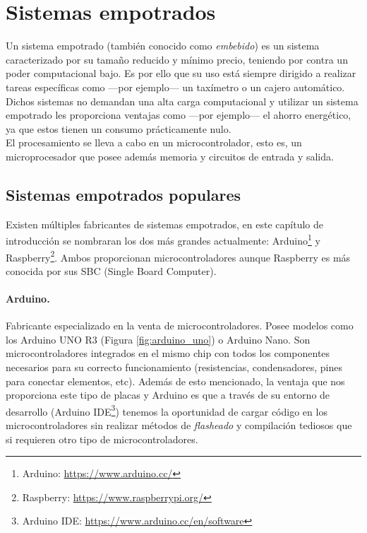 \section{Sistemas empotrados}
\label{sec:empotrados}
Un sistema empotrado (también conocido como \textit{embebido}) es un sistema caracterizado por su tamaño reducido y mínimo precio, teniendo por contra un poder computacional bajo. Es por ello que su uso está siempre dirigido a realizar tareas específicas como ---por ejemplo--- un taxímetro o un cajero automático. Dichos sistemas no demandan una alta carga computacional y utilizar un sistema empotrado les proporciona ventajas como ---por ejemplo--- el ahorro energético, ya que estos tienen un consumo prácticamente nulo.\\

El procesamiento se lleva a cabo en un microcontrolador, esto es, un microprocesador que posee además memoria y circuitos de entrada y salida. 

\subsection{Sistemas empotrados populares}
Existen múltiples fabricantes de sistemas empotrados, en este capítulo de introducción se nombraran los dos más grandes actualmente: Arduino\footnote{Arduino: \url{https://www.arduino.cc/}} y Raspberry\footnote{Raspberry: \url{https://www.raspberrypi.org/}}. Ambos proporcionan microcontroladores aunque Raspberry es más conocida por sus SBC (Single Board Computer).

\paragraph{Arduino.} Fabricante especializado en la venta de microcontroladores. Posee modelos como los Arduino UNO R3 (Figura \ref{fig:arduino_uno}) o Arduino Nano. Son microcontroladores integrados en el mismo chip con todos los componentes necesarios para su correcto funcionamiento (resistencias, condensadores, pines para conectar elementos, etc). Además de esto mencionado, la ventaja que nos proporciona este tipo de placas y Arduino es que a través de su entorno de desarrollo (Arduino IDE\footnote{Arduino IDE: \url{https://www.arduino.cc/en/software}}) tenemos la oportunidad de cargar código en los microcontroladores sin realizar métodos de \textit{flasheado} y compilación tediosos que si requieren otro tipo de microcontroladores.

